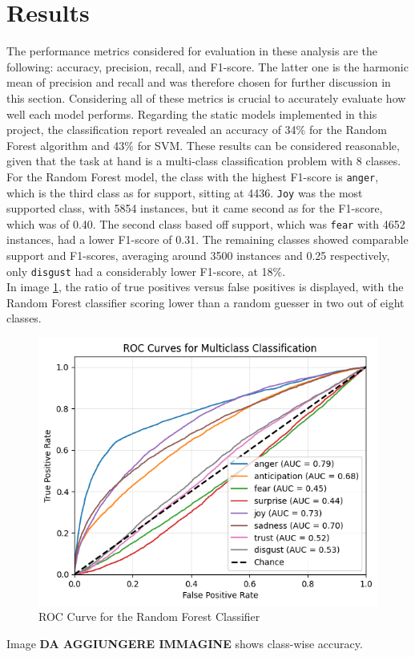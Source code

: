 \chapter*{Results}
\label{ch:results}
The performance metrics considered for evaluation in these analysis are the following: accuracy, precision,
recall, and F1-score. The latter one is the harmonic mean of precision and recall and was therefore chosen for further discussion in this section. Considering all of these metrics is crucial to accurately evaluate how well each
model performs.
Regarding the static models implemented in this project, the classification report revealed an accuracy of
34\% for the Random Forest algorithm and 43\% for SVM. These results can be considered reasonable, given that the task at hand is a multi-class classification problem with 8 classes.\\

For the Random Forest model, the class with the highest F1-score is \texttt{anger}, which is the third class as for support, sitting at 4436. 
\texttt{Joy} was the most supported class, with 5854 instances, but it came second as for the F1-score, which was of 0.40. The second class based off support, which was \texttt{fear} with 4652 instances, had a lower F1-score of 0.31. 
The remaining classes showed comparable support and F1-scores, averaging around 3500 instances and 0.25 respectively, only \texttt{disgust} had a considerably lower F1-score, at 18\%. \\
In image \ref{fig:roc_rf}, the ratio of true positives versus false positives is displayed, with the Random Forest classifier scoring lower than a random guesser in two out of eight classes. \\
\begin{figure}[H]
    \centering
    \includegraphics[width=0.7\linewidth]{pictures/roc_rf.png}
    \caption{ROC Curve for the Random Forest Classifier}
    \label{fig:roc_rf}
\end{figure}
Image \textbf{DA AGGIUNGERE IMMAGINE} shows class-wise accuracy. \\

